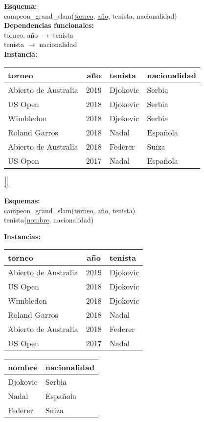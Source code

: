 \documentclass[preview]{standalone}
\begin{document}
\textbf{Esquema:}\\
campeon\_grand\_slam(\underline{torneo}, \underline{a\~no}, tenista, nacionalidad)\\

\textbf{Dependencias funcionales:}\\
torneo, a\~no $\rightarrow$ tenista\\
tenista $\rightarrow$ nacionalidad\\

\textbf{Instancia:}
\begin{center}
\scriptsize
\begin{tabular}{| l | c | l | l |}\hline			
	torneo & a\~no & tenista & nacionalidad  \\\hline			
	Abierto de Australia & 2019 & Djokovic & Serbia \\
	US Open & 2018 & Djokovic & Serbia \\
	Wimbledon & 2018 & Djokovic & Serbia \\
	Roland Garros & 2018 & Nadal & Espa\~nola \\
	Abierto de Australia & 2018 & Federer & Suiza \\
	US Open & 2017 & Nadal & Espa\~nola \\\hline
\end{tabular}



$\Big\Downarrow$
\end{center}

\textbf{Esquemas:}\\
campeon\_grand\_slam(\underline{torneo}, \underline{a\~no}, tenista)\\
tenista(\underline{nombre}, nacionalidad)


\textbf{Instancias:}
\begin{center}
\scriptsize
\begin{tabular}{| l | c | l |}\hline			
	torneo & a\~no & tenista \\\hline			
	Abierto de Australia & 2019 & Djokovic \\
	US Open & 2018 & Djokovic \\
	Wimbledon & 2018 & Djokovic \\
	Roland Garros & 2018 & Nadal \\
	Abierto de Australia & 2018 & Federer \\
	US Open & 2017 & Nadal \\\hline
\end{tabular}
\quad
\begin{tabular}{| l | l |}\hline			
	nombre & nacionalidad \\\hline	
	Djokovic & Serbia\\		
	Nadal & Espa\~nola\\		
	Federer & Suiza\\\hline		
\end{tabular}
\end{center}
\end{document}
